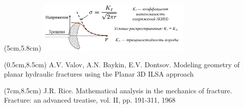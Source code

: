 \documentclass{beamer}
\begin{document}
\begin{frame}
\begin{textblock*}{7.5cm}(5cm,5.8cm)
\includegraphics[width=7.5cm]{part4_propagation.jpg}
\end{textblock*}

\begin{textblock*}{6cm}(0.5cm,8.5cm)
\tiny
\textcolor{lit_gray}{A.V. Valov, A.N. Baykin, E.V. Dontsov.  Modeling geometry of planar hydraulic fractures using the Planar 3D ILSA approach}

\end{textblock*}

\begin{textblock*}{6cm}(7cm,8.5cm)
\tiny
\textcolor{lit_gray}{J.R. Rice. Mathematical analysis in the mechanics of fracture. Fracture: an advanced treatise, vol. II, pp. 191-311, 1968}
\end{textblock*}

\end{frame}
\end{document}
